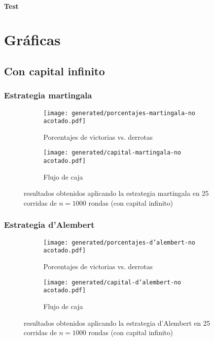 \documentclass{article}
\begin{document}
  \paragraph{Test}


  \section{Gráficas}
  \subsection{Con capital infinito}
  \subsubsection{Estrategia martingala}
  \begin{figure}[H]
    \centering
    \begin{subfigure}{0.5\textwidth}
      \centering
      \texttt{[image: generated/porcentajes-martingala-no acotado.pdf]}
      \caption{Porcentajes de victorias vs. derrotas}
    \end{subfigure}%
	\begin{subfigure}{0.5\textwidth}
	  \centering
      \texttt{[image: generated/capital-martingala-no acotado.pdf]}
	  \caption{Flujo de caja}
	\end{subfigure}
	\caption{resultados obtenidos aplicando la estrategia martingala en 25 corridas de $n = 1000$ rondas (con capital infinito)}
  \end{figure}

  \subsubsection{Estrategia d’Alembert}
  \begin{figure}[H]
    \centering
    \begin{subfigure}{0.5\textwidth}
      \centering
      \texttt{[image: generated/porcentajes-d'alembert-no acotado.pdf]}
      \caption{Porcentajes de victorias vs. derrotas}
    \end{subfigure}%
    \begin{subfigure}{0.5\textwidth}
      \centering
      \texttt{[image: generated/capital-d'alembert-no acotado.pdf]}
      \caption{Flujo de caja}
    \end{subfigure}
    \caption{resultados obtenidos aplicando la estrategia d’Alembert en 25 corridas de $n = 1000$ rondas (con capital infinito)}
  \end{figure}
\end{document}
